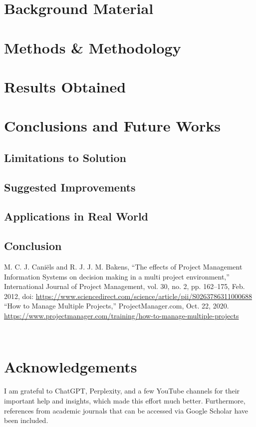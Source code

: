 \documentclass{llncs}
\begin{document}
\section{Background Material}

\section{Methods \& Methodology}

\section{Results Obtained}

\section{Conclusions and Future Works}

\subsection{Limitations to Solution}

\subsection{Suggested Improvements}

\subsection{Applications in Real World}

\subsection{Conclusion}



\begin{thebibliography}{2}
M. C. J. Caniëls and R. J. J. M. Bakens, “The effects of Project Management Information Systems on decision making in a multi project environment,” International Journal of Project Management, vol. 30, no. 2, pp. 162–175, Feb. 2012, doi: \url{https://www.sciencedirect.com/science/article/pii/S0263786311000688}
“How to Manage Multiple Projects,” ProjectManager.com, Oct. 22, 2020. \url{https://www.projectmanager.com/training/how-to-manage-multiple-projects}

‌
‌
‌
‌
\end{thebibliography}




\section{Acknowledgements}
I am grateful to ChatGPT, Perplexity, and a few YouTube channels for their important help and insights, which made this effort much better. Furthermore, references from academic journals that can be accessed via Google Scholar have been included.
\end{document}
